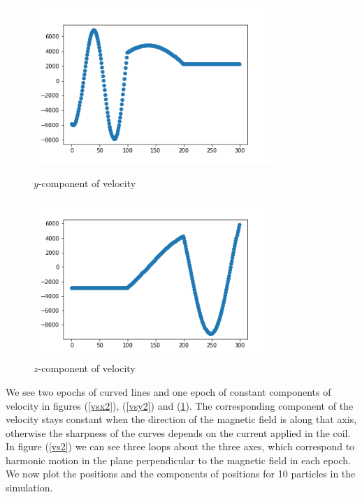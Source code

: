 \documentclass[12pt]{article}
\begin{document}
	\begin{figure}[H]
		\begin{multicols}{2}
			\includegraphics[width=\linewidth, height=6cm]{vsy2.png} \caption{$y$-component of velocity} \label{vsy2} \par
			\includegraphics[width=\linewidth, height=6cm]{vsz2.png} \caption{$z$-component of velocity} \label{vsz2} \par
		\end{multicols}
	\end{figure}
	\noindent We see two epochs of curved lines and one epoch of constant components of velocity in figures (\ref{vsx2}), (\ref{vsy2}) and (\ref{vsz2}). The corresponding component of the velocity stays constant when the direction of the magnetic field is along that axis, otherwise the sharpness of the curves depends on the current applied in the coil. In figure (\ref{vs2}) we can see three loops about the three axes, which correspond to harmonic motion in the plane perpendicular to the magnetic field in each epoch. We now plot the positions and the components of positions for 10 particles in the simulation.
\end{document}
